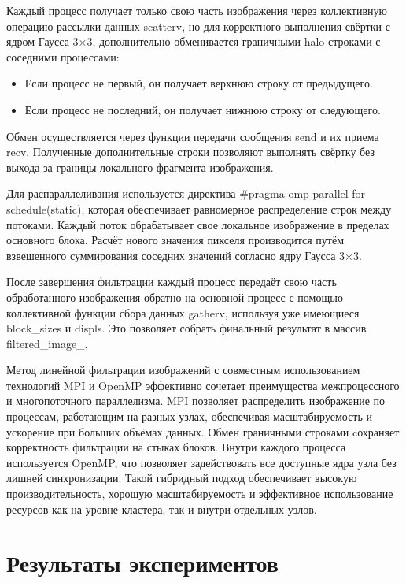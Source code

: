\documentclass[14pt, a4paper]{extarticle}
\newcommand{\code}[1]{{\ttfamily\fontsize{14pt}{16pt}\selectfont #1}}
\begin{document}
Каждый процесс получает только свою часть изображения через коллективную операцию рассылки данных \code{scatterv}, но для корректного выполнения свёртки с ядром Гаусса 3×3, дополнительно обменивается граничными halo-строками с соседними процессами:

\begin{itemize}
  \item Если процесс не первый, он получает верхнюю строку от предыдущего.
  \item Если процесс не последний, он получает нижнюю строку от следующего.
\end{itemize}

Обмен осуществляется через функции передачи сообщения \code{send} и их приема \code{recv}. Полученные дополнительные строки позволяют выполнять свёртку без выхода за границы локального фрагмента изображения.

Для распараллеливания используется директива \code{\#pragma omp parallel for schedule(static)}, которая обеспечивает равномерное распределение строк между потоками. Каждый поток обрабатывает свое локальное изображение в пределах основного блока. Расчёт нового значения пикселя производится путём взвешенного суммирования соседних значений согласно ядру Гаусса 3×3. 

После завершения фильтрации каждый процесс передаёт свою часть обработанного изображения обратно на основной процесс с помощью коллективной функции сбора данных \code{gatherv}, используя уже имеющиеся \code{block\_sizes} и \code{displs}. Это позволяет собрать финальный результат в массив \code{filtered\_image\_}.

Метод линейной фильтрации изображений с совместным использованием технологий MPI и OpenMP эффективно сочетает преимущества межпроцессного и многопоточного параллелизма. MPI позволяет распределить изображение по процессам, работающим на разных узлах, обеспечивая масштабируемость и ускорение при больших объёмах данных. Обмен граничными строками cохраняет корректность фильтрации на стыках блоков. Внутри каждого процесса используется OpenMP, что позволяет задействовать все доступные ядра узла без лишней синхронизации. Такой гибридный подход обеспечивает высокую производительность, хорошую масштабируемость и эффективное использование ресурсов как на уровне кластера, так и внутри отдельных узлов.


\newpage

\section{Результаты экспериментов}
\end{document}
